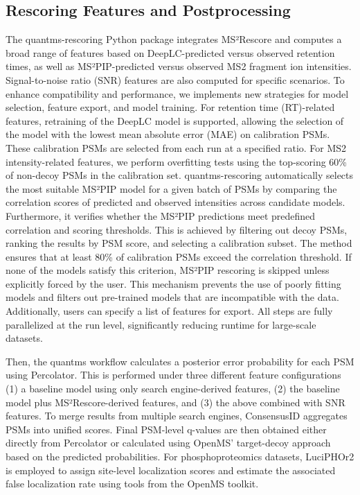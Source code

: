 \documentclass[12pt]{article}
\begin{document}
\subsection{Rescoring Features and Postprocessing}
 The quantms-rescoring Python package integrates MS²Rescore and computes a broad range of features based on DeepLC-predicted versus observed retention times, as well as MS²PIP-predicted versus observed MS2 fragment ion intensities. Signal-to-noise ratio (SNR) features are also computed for specific scenarios. %
 To enhance compatibility and performance, we implements new strategies for model selection, feature export, and model training. For retention time (RT)-related features, retraining of the DeepLC model is supported, allowing the selection of the model with the lowest mean absolute error (MAE) on calibration PSMs. These calibration PSMs are selected from each run at a specified ratio. %
 For MS2 intensity-related features, we perform overfitting tests using the top-scoring 60\% of non-decoy PSMs in the calibration set. quantms-rescoring automatically selects the most suitable MS²PIP model for a given batch of PSMs by comparing the correlation scores of predicted and observed intensities across candidate models. Furthermore, it verifies whether the MS²PIP predictions meet predefined correlation and scoring thresholds. This is achieved by filtering out decoy PSMs, ranking the results by PSM score, and selecting a calibration subset. The method ensures that at least 80\% of calibration PSMs exceed the correlation threshold. If none of the models satisfy this criterion, MS²PIP rescoring is skipped unless explicitly forced by the user. This mechanism prevents the use of poorly fitting models and filters out pre-trained models that are incompatible with the data. Additionally, users can specify a list of features for export. All steps are fully parallelized at the run level, significantly reducing runtime for large-scale datasets.
 
 Then, the quantms workflow calculates a posterior error probability for each PSM using Percolator. This is performed under three different feature configurations (1) a baseline model using only search engine-derived features, (2) the baseline model plus MS²Rescore-derived features, and (3) the above combined with SNR features. To merge results from multiple search engines, ConsensusID aggregates PSMs into unified scores. Final PSM-level q-values are then obtained either directly from Percolator or calculated using OpenMS' target-decoy approach based on the predicted probabilities. For phosphoproteomics datasets, LuciPHOr2 is employed to assign site-level localization scores and estimate the associated false localization rate using tools from the OpenMS toolkit. %
\end{document}
